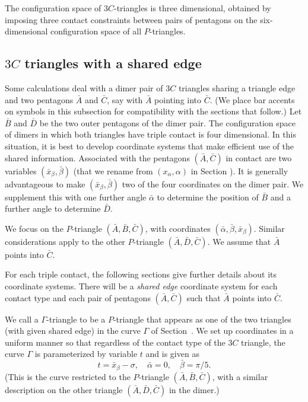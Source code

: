 The configuration space of $3C$-triangles is three dimensional,
obtained by imposing three contact constraints between pairs of
pentagons on the six-dimensional configuration space of all
$P$-triangles.

\subsection{$3C$ triangles with a shared edge}

Some calculations deal with a dimer pair of $3C$ triangles sharing a
triangle edge and two pentagons $\bar{A}$ and $\bar{C}$, say with
$\bar{A}$ pointing into $\bar{C}$.  (We place bar accents on symbols
in this subsection for compatibility with the sections that follow.)
Let $\bar{B}$ and $\bar{D}$ be the two outer pentagons of the dimer
pair.  The configuration space of dimers in which both triangles have
triple contact is four dimensional.  In this situation, it is best to
develop coordinate systems that make efficient use of the shared
information.  Associated with the pentagons $(\bar{A},\bar{C})$ in
contact are two variables $(\bar x_\beta,\bar\beta)$ (that we rename
from $(x_\alpha,\alpha)$ in Section ).  It is generally
advantageous to make $(\bar x_\beta,\bar\beta)$ two of the four
coordinates on the dimer pair.  We supplement this with one further
angle $\bar\alpha$ to determine the position of $\bar B$ and a further
angle to determine $\bar D$.

We focus on the $P$-triangle $(\bar A,\bar B,\bar C)$, with
coordinates $(\bar\alpha,\bar\beta,\bar x_\beta)$.  Similar
considerations apply to the other $P$-triangle $(\bar A,\bar D,\bar
C)$.  We assume that $\bar A$ points into $\bar C$.

For each triple contact, the following sections give further details
about its coordinate systems.  There will be a {\it shared edge}
coordinate system for each contact type and each pair of pentagons
$(\bar A,\bar C)$ such that $\bar A$ points into $\bar C$.

We call a $\Gamma$-triangle to be a $P$-triangle that appears as one
of the two triangles (with given shared edge) in the curve $\Gamma$ of
Section~.  We set up coordinates in a uniform manner so
that regardless of the contact type of the $3C$ triangle, the curve
$\Gamma$ is parameterized by variable $t$ and is given as
\[
t = \bar x_\beta  -\sigma, \quad
\bar\alpha = 0,\quad
\bar\beta = \pi/5.
\]
(This is the curve restricted to the $P$-triangle $(\bar A,\bar B,\bar
C)$, with a similar description on the other triangle $(\bar A,\bar
D,\bar C)$ in the dimer.)


